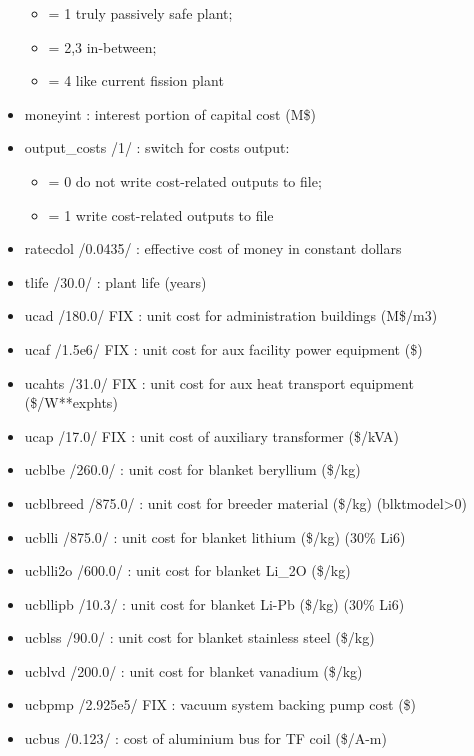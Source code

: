 \documentclass[]{article}
\begin{document}
\begin{itemize}
  \begin{itemize}
  \itemsep1pt\parskip0pt
  \item
    = 1 truly passively safe plant;
  \item
    = 2,3 in-between;
  \item
    = 4 like current fission plant
  \end{itemize}
\item
  moneyint : interest portion of capital cost (M\$)
\item
  output\_costs /1/ : switch for costs output:

  \begin{itemize}
  \itemsep1pt\parskip0pt
  \item
    = 0 do not write cost-related outputs to file;
  \item
    = 1 write cost-related outputs to file
  \end{itemize}
\item
  ratecdol /0.0435/ : effective cost of money in constant dollars
\item
  tlife /30.0/ : plant life (years)
\item
  ucad /180.0/ FIX : unit cost for administration buildings (M\$/m3)
\item
  ucaf /1.5e6/ FIX : unit cost for aux facility power equipment (\$)
\item
  ucahts /31.0/ FIX : unit cost for aux heat transport equipment
  (\$/W**exphts)
\item
  ucap /17.0/ FIX : unit cost of auxiliary transformer (\$/kVA)
\item
  ucblbe /260.0/ : unit cost for blanket beryllium (\$/kg)
\item
  ucblbreed /875.0/ : unit cost for breeder material (\$/kg)
  (blktmodel\textgreater{}0)
\item
  ucblli /875.0/ : unit cost for blanket lithium (\$/kg) (30\% Li6)
\item
  ucblli2o /600.0/ : unit cost for blanket Li\_2O (\$/kg)
\item
  ucbllipb /10.3/ : unit cost for blanket Li-Pb (\$/kg) (30\% Li6)
\item
  ucblss /90.0/ : unit cost for blanket stainless steel (\$/kg)
\item
  ucblvd /200.0/ : unit cost for blanket vanadium (\$/kg)
\item
  ucbpmp /2.925e5/ FIX : vacuum system backing pump cost (\$)
\item
  ucbus /0.123/ : cost of aluminium bus for TF coil (\$/A-m)

\end{itemize}
\end{document}
